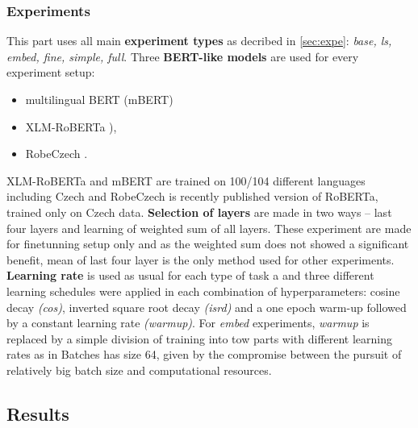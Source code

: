 \subsubsection{Experiments}
This part uses all main \textbf{experiment types} as decribed in \ref{sec:expe}: \textit{base, ls, embed, fine, simple, full}. Three \textbf{BERT-like models} are used for every experiment setup:
\begin{itemize}
\item multilingual BERT (mBERT) \citep{Devlin2019} 
\item XLM-RoBERTa \citep{Conneau2019}), 
\item RobeCzech \citep{Straka2021}.
\end{itemize}
XLM-RoBERTa and mBERT are trained on 100/104 different languages including Czech and RobeCzech is recently published version of RoBERTa, trained only on Czech data. %
\textbf{Selection of layers} are made in two ways -- last four layers and learning of weighted sum of all layers. These experiment are made for finetunning setup only and as the weighted sum does not showed a significant benefit, mean of last four layer is the only method used for other experiments. \textbf{Learning rate} is used as usual for each type of task a and three different learning schedules were applied in each combination of hyperparameters: cosine decay \textit{(cos)}, inverted square root decay \textit{(isrd)} and a one epoch warm-up followed by a constant learning rate \textit{(warmup)}. For \textit{embed} experiments, \textit{warmup} is replaced by  a simple division of training into tow parts with different learning rates as in %
Batches has size 64, given by the compromise between the pursuit of relatively big batch size and computational resources.


\subsection{Results}

